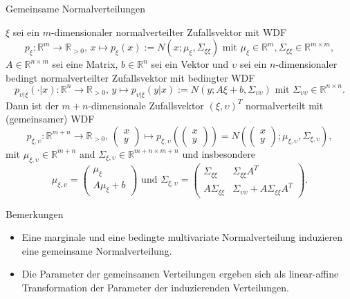 \documentclass[
  8pt,
  ignorenonframetext,
]{beamer}
\providecommand{\tightlist}{%
  \setlength{\itemsep}{0pt}\setlength{\parskip}{0pt}}
\newcommand{\ups}{\upsilon}
\begin{document}
\begin{frame}{Gemeinsame Normalverteilungen}
\protect\hypertarget{gemeinsame-normalverteilungen}{}
\footnotesize
\begin{theorem}
\justifying
\normalfont
$\xi$ sei ein $m$-dimensionaler normalverteilter Zufallsvektor mit WDF
\begin{equation}
p_\xi : \mathbb{R}^m \to \mathbb{R}_{>0},\,x\mapsto
p_\xi(x) := N(x;\mu_\xi,\Sigma_{\xi\xi}) \mbox{ mit }
\mu_\xi \in \mathbb{R}^m,
\Sigma_{\xi\xi} \in \mathbb{R}^{m\times m},
\end{equation}
$A\in\mathbb{R}^{n\times m}$ sei eine Matrix, $b\in\mathbb{R}^n$ sei ein Vektor
und $\ups$ sei ein $n$-dimensionaler bedingt normalverteilter Zufallsvektor mit
bedingter WDF
\begin{equation}
p_{\ups|\xi}(\cdot|x) : \mathbb{R}^n \to \mathbb{R}_{>0},\, y\mapsto
p_{\ups|\xi}(y|x) := N(y;A\xi+b,\Sigma_{\ups\ups}) \mbox{ mit }
\Sigma_{\ups\ups} \in \mathbb{R}^{n\times n}.
\end{equation}
Dann ist der $m+n$-dimensionale Zufallsvektor $(\xi,\ups)^T$ normalverteilt mit (gemeinsamer) WDF
\begin{equation}\label{eq:gauss_joint}
p_{\xi,\ups} : \mathbb{R}^{m+n} \to \mathbb{R}_{>0},\, \begin{pmatrix} x \\ y \end{pmatrix} \mapsto
p_{\xi,\ups}\left(\begin{pmatrix} x \\ y \end{pmatrix}\right) = N\left(\begin{pmatrix} x \\ y \end{pmatrix};
\mu_{\xi,\ups}, \Sigma_{\xi,\ups} \right),
\end{equation}
mit $\mu_{\xi,\ups} \in \mathbb{R}^{m+n}$ and $\Sigma_{\xi,\ups} \in \mathbb{R}^{m+n \times m+n}$ und insbesondere
\begin{equation}
\mu_{\xi,\ups} = \left( \begin{matrix} \mu_\xi \\ A\mu_\xi + b \end{matrix} \right)
\mbox{ und }
\Sigma_{\xi,\ups} = \left(\begin{matrix} \Sigma_{\xi\xi} & \Sigma_{\xi\xi}A^T \\ A\Sigma_{\xi\xi} & \Sigma_{\ups\ups} + A\Sigma_{\xi\xi}A^T \end{matrix} \right).
\end{equation}
\end{theorem}

Bemerkungen

\begin{itemize}
\tightlist
\item
  Eine marginale und eine bedingte multivariate Normalverteilung
  induzieren eine gemeinsame Normalverteilung.
\item
  Die Parameter der gemeinsamen Verteilungen ergeben sich als
  linear-affine Transformation der Parameter der induzierenden
  Verteilungen.
\end{itemize}
\end{frame}
\end{document}
